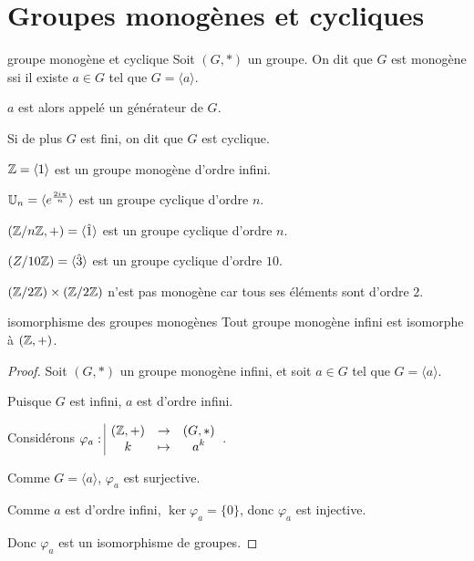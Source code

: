 \section{Groupes monogènes et cycliques }

\begin{definition}{groupe monogène et cyclique}{}
    Soit $(G, \ast)$ un groupe. On dit que $G$ est monogène ssi il existe $a \in G$ tel que 
    $G = \langle a \rangle$. 

    $a$ est alors appelé un générateur de $G$.

    Si de plus $G$ est fini, on dit que $G$ est cyclique.
\end{definition}

\begin{exemple}
    $\mathbb{Z} = \langle 1 \rangle$ est un groupe monogène d'ordre infini.

    $\mathbb{U}_n = \langle e^{\frac{2i\pi} n} \rangle$ est un groupe cyclique d'ordre $n$.

    $(\mathbb{Z}/n\mathbb{Z}, +) = \langle \hat 1 \rangle$ est un groupe cyclique d'ordre $n$.

    $(Z / 10 \mathbb{Z}) = \langle \hat 3 \rangle$ est un groupe cyclique d'ordre $10$.
    
    $(\mathbb{Z} / 2 \mathbb{Z}) \times (\mathbb{Z} / 2 \mathbb{Z})$ n'est pas monogène car tous ses éléments sont d'ordre $2$. 
\end{exemple}

\begin{theoreme}{isomorphisme des groupes monogènes}{}
    Tout groupe monogène infini est isomorphe à $(\mathbb{Z}, +)$.
\end{theoreme}


\begin{proof}
    Soit $(G, \ast)$ un groupe monogène infini, et soit $a \in G$ tel que $G = \langle a \rangle$.

    Puisque $G$ est infini, $a$ est d'ordre infini.

    Considérons $\varphi_a: \space \begin{array}{|ccc} \displaystyle (\mathbb{Z}, +) & \to & \displaystyle (G, \ast) \\ \displaystyle k & \mapsto & \displaystyle a^k \end{array}$.

    Comme $G = \langle a \rangle$, $\varphi_a$ est surjective.

    Comme $a$ est d'ordre infini, $\ker \varphi_a = \{0\}$, donc $\varphi_a$ est injective.

    Donc $\varphi_a$ est un isomorphisme de groupes.
\end{proof}

